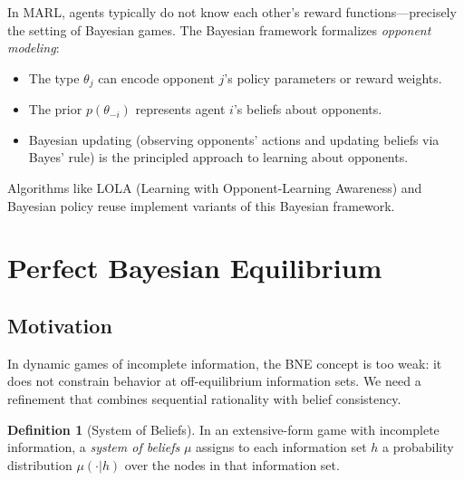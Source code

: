 \documentclass[11pt,a4paper]{article}
\theoremstyle{definition}
\newtheorem{definition}{Definition}[section]
\theoremstyle{plain}
\theoremstyle{remark}
\begin{document}
\begin{rlconnection}
In MARL, agents typically do not know each other's reward functions---precisely the
setting of Bayesian games. The Bayesian framework formalizes \emph{opponent modeling}:
\begin{itemize}
    \item The type $\theta_j$ can encode opponent $j$'s policy parameters or reward weights.
    \item The prior $p(\theta_{-i})$ represents agent $i$'s beliefs about opponents.
    \item Bayesian updating (observing opponents' actions and updating beliefs via Bayes'
    rule) is the principled approach to learning about opponents.
\end{itemize}
Algorithms like LOLA (Learning with Opponent-Learning Awareness) and Bayesian policy
reuse implement variants of this Bayesian framework.
\end{rlconnection}


\section{Perfect Bayesian Equilibrium}
\label{sec:pbe}

\subsection{Motivation}

In dynamic games of incomplete information, the BNE concept is too weak: it does not
constrain behavior at off-equilibrium information sets. We need a refinement that combines
sequential rationality with belief consistency.

\begin{definition}[System of Beliefs]
\label{def:beliefs}
In an extensive-form game with incomplete information, a \emph{system of beliefs}
$\mu$ assigns to each information set $h$ a probability distribution $\mu(\cdot | h)$
over the nodes in that information set.
\end{definition}
\end{document}
